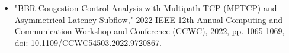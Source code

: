 \begin{itemize}
    \item "BBR Congestion Control Analysis with Multipath TCP (MPTCP) and Asymmetrical Latency Subflow," 2022 IEEE 12th Annual Computing and Communication Workshop and Conference (CCWC), 2022, pp. 1065-1069, doi: 10.1109/CCWC54503.2022.9720867.
\end{itemize}